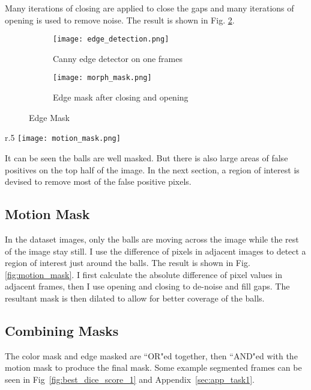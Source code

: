 \documentclass{report}
\begin{document}
Many iterations of closing are applied to close the gaps and many iterations of opening is used to remove noise. The result is shown in Fig. \ref{fig:morph_mask}.

\begin{figure}
    \centering
    \begin{subfigure}[b]{0.49\textwidth}
        \centering
        \texttt{[image: edge\_detection.png]}
        \caption{Canny edge detector on one frames}
        \label{fig:edge_mask}
    \end{subfigure}
    \begin{subfigure}[b]{0.49\textwidth}
        \centering
        \texttt{[image: morph\_mask.png]}
        \caption{Edge mask after closing and opening}
        \label{fig:morph_mask}
    \end{subfigure}
    \caption{Edge Mask}
    \label{fig:edge_masks}
\end{figure}

\begin{wrapfigure}{r}{.5\textwidth}
    \centering
    \texttt{[image: motion\_mask.png]}
    \caption{Motion mask applied to one of the frames}
    \label{fig:motion_mask}
\end{wrapfigure}

It can be seen the balls are well masked. But there is also large areas of false positives on the top half of the image. In the next section, a region of interest is devised to remove most of the false positive pixels.

\subsection{Motion Mask}

In the dataset images, only the balls are moving across the image while the rest of the image stay still. I use the difference of pixels in adjacent images to detect a region of interest just around the balls. The result is shown in Fig. \ref{fig:motion_mask}. I first calculate the absolute difference of pixel values in adjacent frames, then I use opening and closing to de-noise and fill gaps. The resultant mask is then dilated to allow for better coverage of the balls.

\subsection{Combining Masks}

The color mask and edge masked are ``OR"ed together, then ``AND"ed with the motion mask to produce the final mask. Some example segmented frames can be seen in Fig~\ref{fig:best_dice_score_1} and Appendix~\ref{sec:app_task1}.
\end{document}
